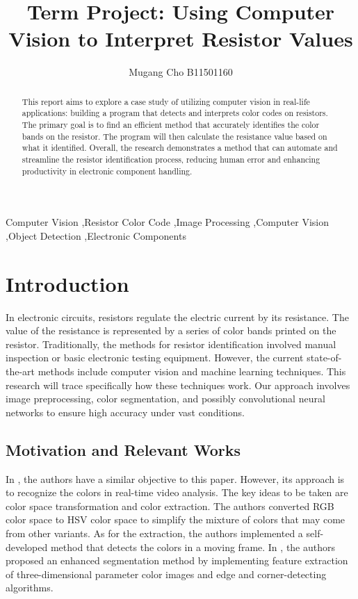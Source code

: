 \documentclass[preprint,12pt,3p,times]{elsarticle}
\begin{document}
\begin{frontmatter}

\title{Term Project: Using Computer Vision to Interpret Resistor Values}

\author[1]{Mugang Cho B11501160}

\address[1]{Department of Civil Engineering, National Taiwan University, Taipei, Taiwan}

\begin{abstract}
This report aims to explore a case study of utilizing computer vision in real-life applications: building a program that detects and interprets color codes on resistors. The primary goal is to find an efficient method that accurately identifies the color bands on the resistor. The program will then calculate the resistance value based on what it identified. Overall, the research demonstrates a method that can automate and streamline the resistor identification process, reducing human error and enhancing productivity in electronic component handling.
\end{abstract}

\begin{keyword}
Computer Vision \sep Resistor Color Code \sep Image Processing \sep Computer Vision \sep Object Detection \sep Electronic Components

\end{keyword}
    
\end{frontmatter}

\section{Introduction}
In electronic circuits, resistors regulate the electric current by its resistance. The value of the resistance is represented by a series of color bands printed on the resistor. Traditionally, the methods for resistor identification involved manual inspection or basic electronic testing equipment. However, the current state-of-the-art methods include computer vision and machine learning techniques. This research will trace specifically how these techniques work. Our approach involves image preprocessing, color segmentation, and possibly convolutional neural networks to ensure high accuracy under vast conditions. 

\subsection{Motivation and Relevant Works}
In \cite{ref1}, the authors have a similar objective to this paper. However, its approach is to recognize the colors in real-time video analysis. The key ideas to be taken are color space transformation and color extraction. The authors converted RGB color space to HSV color space to simplify the mixture of colors that may come from other variants. As for the extraction, the authors implemented a self-developed method that detects the colors in a moving frame.
In \cite{ref2}, the authors proposed an enhanced segmentation method by implementing feature extraction of three-dimensional parameter color images and edge and corner-detecting algorithms.
\end{document}
